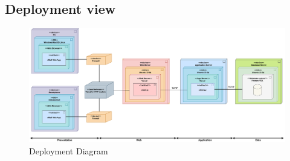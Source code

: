 \documentclass[table, 12pt]{article}
\begin{document}
\subsection{Deployment view}
\begin{center}
    \begin{figure}[H]
        \includegraphics[scale=0.35, center]{assets/archimate.png}
        \caption{Deployment Diagram}
        \label{fig: deployment_diagram}
    \end{figure}
\end{center}
\end{document}
